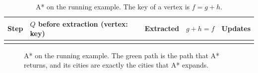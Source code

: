 \begin{table}[htbp]
  \centering
  \caption{A* on the running example. The key of a vertex is
    $f = g + h$.}\label{tab:trace-h}
  \small
  \begin{tabular}{@{}c>{\raggedright}P{4.4cm}cc>{\raggedright\arraybackslash}P{3.8cm}@{}}
    \toprule
    Step & $Q$ before extraction (vertex: key) & Extracted & $g + h = f$
      & Updates\\
    \midrule
    \bottomrule
  \end{tabular}
\end{table}

\begin{figure}[htbp]
  \centering
  \resizebox{0.62\textwidth}{!}{}
  \caption{A* on the running example. The green path is the path that A*
    returns, and its cities are exactly the cities that A*
    expands.}\label{fig:story}
\end{figure}
